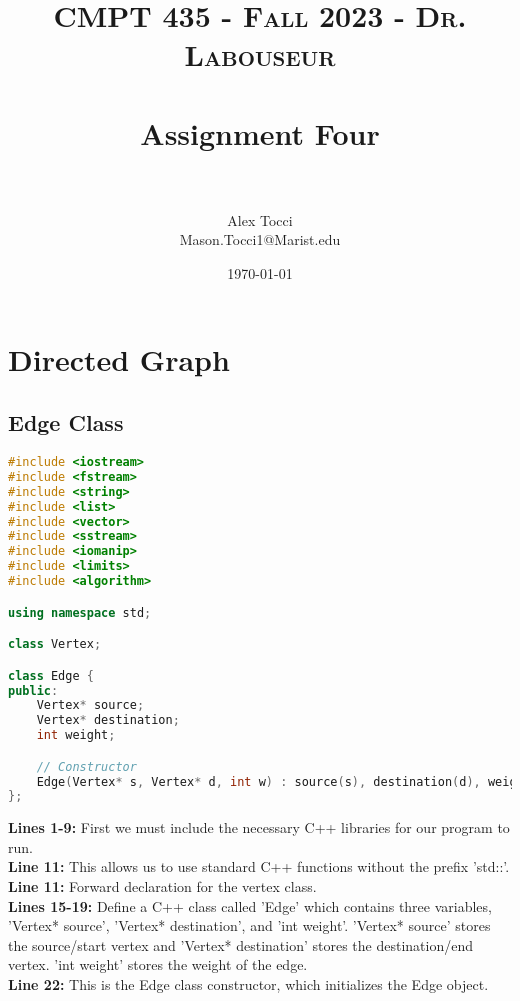 \documentclass[letterpaper, 10pt,DIV=13]{scrartcl}
\title{	
   \normalfont \normalsize 
   \textsc{CMPT 435 - Fall 2023 - Dr. Labouseur} \\[10pt] %
   \horrule{0.5pt} \\[0.25cm] 	%
   \huge Assignment Four  \\     	    %
   \horrule{0.5pt} \\[0.25cm] 	%
}
\author{Alex Tocci \\ \normalsize Mason.Tocci1@Marist.edu}
\date{\normalsize\today} 	%
\numberwithin{equation}{section} %
\numberwithin{figure}{section} %
\numberwithin{table}{section} %
\begin{document}
\maketitle %

\section{Directed Graph}
\subsection{Edge Class}
\begin{linenumbers}
\begin{lstlisting}[language=C++, caption={Edge Class}, label={code:example}]
#include <iostream>
#include <fstream>
#include <string>
#include <list>
#include <vector>
#include <sstream>
#include <iomanip>
#include <limits>
#include <algorithm>

using namespace std;

class Vertex; 

class Edge {
public:
    Vertex* source;
    Vertex* destination;
    int weight;

    // Constructor
    Edge(Vertex* s, Vertex* d, int w) : source(s), destination(d), weight(w) {}
};
\end{lstlisting}
\end{linenumbers}
\nolinenumbers

\textbf{Lines 1-9:} First we must include the necessary C++ libraries for our program to run. \\
\textbf{Line 11:} This allows us to use standard C++ functions without the prefix 'std::'. \\
\textbf{Line 11:} Forward declaration for the vertex class. \\
\textbf{Lines 15-19:} Define a C++ class called 'Edge' which contains three variables, 'Vertex* source', 'Vertex* destination', and 'int weight'. 'Vertex* source' stores the source/start vertex and 'Vertex* destination' stores the destination/end vertex. 'int weight' stores the weight of the edge. \\
\textbf{Line 22:} This is the Edge class constructor, which initializes the Edge object.
\end{document}

